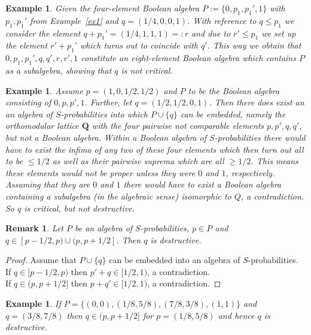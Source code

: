 \documentclass[12pt]{article}
\newtheorem{remark}[theorem]{Remark}
\newtheorem{example}[theorem]{Example}
\begin{document}
\begin{example}\label{ex2}
Given the four-element Boolean algebra $P:=\{0,p_1,p_1',1\}$ with $p_1,p_1'$ from Example~\ref{ex1} and $q=(1/4,0,0,1)$. With reference to $q\le p_1$ we consider the element $q+p_1'=(1/4,1,1,1)=:r$ and due to $r'\le p_1$ we set up the element $r'+p_1'$ which turns out to coincide with $q'$. This way we obtain that $0,p_1,p_1',q,q',r,r',1$ constitute an eight-element Boolean algebra which contains $P$ as a subalgebra, showing that $q$ is not critical. 
\end{example}

\begin{example}
Assume $p=(1,0,1/2,1/2)$ and $P$ to be the Boolean algebra consisting of $0,p,p',1$. Further, let $q=(1/2,1/2,0,1)$. Then there does exist an an algebra of $S$-prob\-a\-bil\-i\-ties into which $P\cup\{q\}$ can be embedded, namely the orthomodular lattice $\mathbf Q$ with the four pairwise not comparable elements $p,p',q,q'$, but not a Boolean algebra. Within a Boolean algebra of $S$-probabilities there would have to exist the infima of any two of these four elements which then turn out all to be $\le1/2$ as well as their pairwise suprema which are all $\ge1/2$. This means these elements would not be proper unless they were $0$ and $1$, respectively. Assuming that they are $0$ and $1$ there would have to exist a Boolean algebra containing a subalgebra {\rm(}in the algebraic sense{\rm)} isomorphic to $Q$, a contradiction. So $q$ is critical, but not destructive.
\end{example}

\begin{remark}
Let $P$ be an algebra of $S$-probabilities, $p\in P$ and $q\in[p-1/2,p)\cup(p,p+1/2]$. Then $q$ is destructive.
\end{remark}

\begin{proof}
Assume that $P\cup\{q\}$ can be embedded into an algebra of $S$-probabilities. \\
If $q\in[p-1/2,p)$ then $p'+q\in[1/2,1)$, a contradiction. \\
If $q\in(p,p+1/2]$ then $p+q'\in[1/2,1)$, a contradiction.
\end{proof}

\begin{example}
If $P=\{(0,0),(1/8,5/8),(7/8,3/8),(1,1)\}$ and $q=(3/8,7/8)$ then $q\in(p,p+1/2]$ for $p=(1/8,5/8)$ and hence $q$ is destructive.	
\end{example}
\end{document}
